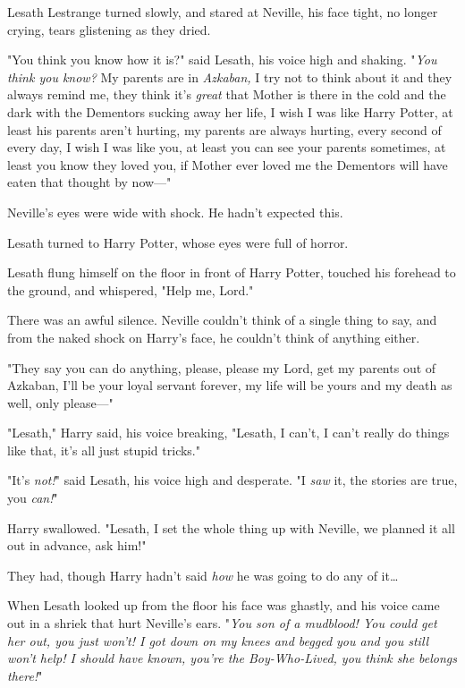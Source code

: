 Lesath Lestrange turned slowly, and stared at Neville, his face tight, no 
longer crying, tears glistening as they dried.

"You think you know how it is?" said Lesath, his voice high and shaking. 
"\emph{You think you know?} My parents are in \emph{Azkaban,} I try not to 
think about it and they always remind me, they think it's \emph{great} that 
Mother is there in the cold and the dark with the Dementors sucking away her 
life, I wish I was like Harry Potter, at least his parents aren't hurting, my 
parents are always hurting, every second of every day, I wish I was like you, 
at least you can see your parents sometimes, at least you know they loved you, 
if Mother ever loved me the Dementors will have eaten that thought by now---"

Neville's eyes were wide with shock. He hadn't expected this.

Lesath turned to Harry Potter, whose eyes were full of horror.

Lesath flung himself on the floor in front of Harry Potter, touched his 
forehead to the ground, and whispered, "Help me, Lord."

There was an awful silence. Neville couldn't think of a single thing to say, 
and from the naked shock on Harry's face, he couldn't think of anything either.

"They say you can do anything, please, please my Lord, get my parents out of 
Azkaban, I'll be your loyal servant forever, my life will be yours and my death 
as well, only please---"

"Lesath," Harry said, his voice breaking, "Lesath, I can't, I can't really do 
things like that, it's all just stupid tricks."

"It's \emph{not!}" said Lesath, his voice high and desperate. "I \emph{saw} it, 
the stories are true, you \emph{can!}"

Harry swallowed. "Lesath, I set the whole thing up with Neville, we planned it 
all out in advance, ask him!"

They had, though Harry hadn't said \emph{how} he was going to do any of 
it{\ldots}

When Lesath looked up from the floor his face was ghastly, and his voice came 
out in a shriek that hurt Neville's ears. "\emph{You son of a mudblood! You 
could get her out, you just won't! I got down on my knees and begged you and 
you still won't help! I should have known, you're the Boy-Who-Lived, you think 
she belongs there!}"

